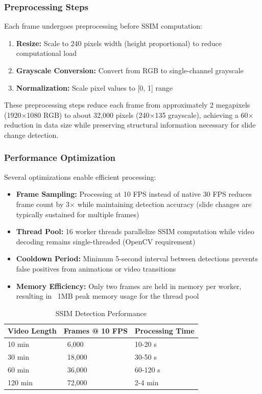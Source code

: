 \documentclass[12pt,a4paper]{article}
\begin{document}
\subsubsection{Preprocessing Steps}

Each frame undergoes preprocessing before SSIM computation:

\begin{enumerate}
    \item \textbf{Resize:} Scale to 240 pixels width (height proportional) to reduce computational load
    \item \textbf{Grayscale Conversion:} Convert from RGB to single-channel grayscale
    \item \textbf{Normalization:} Scale pixel values to [0, 1] range
\end{enumerate}

These preprocessing steps reduce each frame from approximately 2 megapixels (1920$\times$1080 RGB) to about 32,000 pixels (240$\times$135 grayscale), achieving a 60$\times$ reduction in data size while preserving structural information necessary for slide change detection.

\subsubsection{Performance Optimization}

Several optimizations enable efficient processing:

\begin{itemize}
    \item \textbf{Frame Sampling:} Processing at 10 FPS instead of native 30 FPS reduces frame count by 3$\times$ while maintaining detection accuracy (slide changes are typically sustained for multiple frames)
    \item \textbf{Thread Pool:} 16 worker threads parallelize SSIM computation while video decoding remains single-threaded (OpenCV requirement)
    \item \textbf{Cooldown Period:} Minimum 5-second interval between detections prevents false positives from animations or video transitions
    \item \textbf{Memory Efficiency:} Only two frames are held in memory per worker, resulting in ~1MB peak memory usage for the thread pool
\end{itemize}

\begin{table}[H]
    \centering
    \caption{SSIM Detection Performance}
    \begin{tabular}{@{}lll@{}}
        \toprule
        \textbf{Video Length} & \textbf{Frames @ 10 FPS} & \textbf{Processing Time} \\ \midrule
        10 min & ~6,000 & 10-20 s \\
        30 min & ~18,000 & 30-50 s \\
        60 min & ~36,000 & 60-120 s \\
        120 min & ~72,000 & 2-4 min \\ \bottomrule
    \end{tabular}
\end{table}
\end{document}
